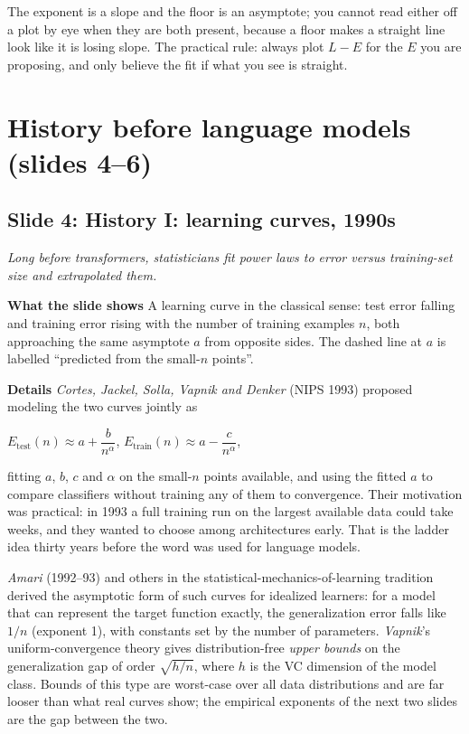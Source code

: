 \documentclass[11pt,letterpaper]{article}
\newcommand{\setstage}[1]{\colorlet{stagec}{#1}}
\newcommand{\slide}[3]{%
  \subsection[Slide #1: #2]{Slide #1: #2}%
  {\color{muted}\itshape #3\par}\medskip}
\newcommand{\para}[1]{\medskip\noindent\textbf{#1}\quad}
\newenvironment{intuition}{\begin{tcolorbox}[intuitionbox]}{\end{tcolorbox}}
\newenvironment{formulas}{\begin{tcolorbox}[formulabox]}{\end{tcolorbox}}
\begin{document}
\begin{intuition}
The exponent is a slope and the floor is an asymptote; you cannot read either off a plot by eye when they are both present, because a floor makes a straight line look like it is losing slope. The practical rule: always plot $L-E$ for the $E$ you are proposing, and only believe the fit if what you see is straight.
\end{intuition}

\setstage{tok}
\section{History before language models (slides 4--6)}

\slide{4}{History I: learning curves, 1990s}{Long before transformers, statisticians fit power laws to error versus training-set size and extrapolated them.}

\para{What the slide shows} A learning curve in the classical sense: test error falling and training error rising with the number of training examples $n$, both approaching the same asymptote $a$ from opposite sides. The dashed line at $a$ is labelled ``predicted from the small-$n$ points''.

\para{Details} \emph{Cortes, Jackel, Solla, Vapnik and Denker} (NIPS 1993) proposed modeling the two curves jointly as
\begin{formulas}
$E_{\text{test}}(n)\approx a + \dfrac{b}{n^{\alpha}}$, \qquad $E_{\text{train}}(n)\approx a - \dfrac{c}{n^{\alpha}}$,
\end{formulas}
fitting $a$, $b$, $c$ and $\alpha$ on the small-$n$ points available, and using the fitted $a$ to compare classifiers without training any of them to convergence. Their motivation was practical: in 1993 a full training run on the largest available data could take weeks, and they wanted to choose among architectures early. That is the ladder idea thirty years before the word was used for language models.

\emph{Amari} (1992--93) and others in the statistical-mechanics-of-learning tradition derived the asymptotic form of such curves for idealized learners: for a model that can represent the target function exactly, the generalization error falls like $1/n$ (exponent 1), with constants set by the number of parameters. \emph{Vapnik}'s uniform-convergence theory gives distribution-free \emph{upper bounds} on the generalization gap of order $\sqrt{h/n}$, where $h$ is the VC dimension of the model class. Bounds of this type are worst-case over all data distributions and are far looser than what real curves show; the empirical exponents of the next two slides are the gap between the two.
\end{document}
